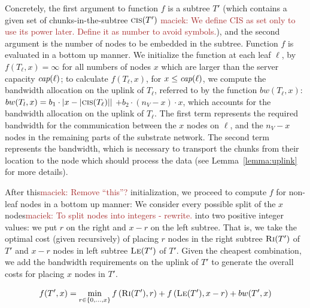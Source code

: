 \documentclass[9pt]{sigcomm-alternate}
\newcommand{\carlo}[1]{\textcolor{red}{carlo: #1}}
\newcommand{\maciek}[1]{\textcolor{brown}{maciek: #1}}
\newcommand{\ChunkCount}{\ensuremath{\textsc{cis}}}
\newcommand{\capacity}{\emph{cap}}
\newcommand{\Tree}{\ensuremath{T}}
\newcommand{\CostTrans}{\ensuremath{b_1}}
\newcommand{\CostCom}{\ensuremath{b_2}}
\newcommand{\Vms}{\ensuremath{n_V}}
\begin{document}
Concretely, the first argument to function $f$
is a subtree $\Tree'$ (which contains a given set of chunks-in-the-subtree $\ChunkCount(\Tree')$ \maciek{We define CIS as set only to use its power later. Define it as number to avoid symbols.}),
and the
second argument is the number of nodes to be embedded in the subtree.
Function $f$ is evaluated in a bottom up manner. We initialize the
function at each leaf $\ell$, by $f(T_{\ell},x) =
\infty$ for all numbers of nodes $x$ which are larger than
the server capacity $\capacity(\ell)$;
to calculate $f(T_{\ell}, x)$, for $x \leq \capacity(\ell)$, we compute the
bandwidth allocation on the uplink of $T_{\ell}$, referred to by the function
$bw(T_{\ell},x)$: $bw(T_l,x)=  \CostTrans \cdot |x - |\ChunkCount(T_{\ell})||$ $
+ \CostCom \cdot (\Vms - x) \cdot x$,
which accounts for the bandwidth allocation on the uplink of $T_{\ell}$. The first
term represents the required bandwidth for the communication between the $x$
nodes on $\ell$, and the $\Vms - x$ nodes in the remaining parts of the substrate
network.
The second term represents
the bandwidth, which is necessary to transport the chunks from their location to
the node which should process the data (see Lemma~\ref{lemma:uplink} for more
details).

After this\maciek{Remove ``this''?} initialization, we proceed to compute $f$ for non-leaf
nodes in a bottom up manner: We consider every possible split of the $x$ nodes\maciek{To split nodes into integers - rewrite.}
into two positive integer
values: we put $r$ on the right and $x - r$ on the left subtree.
That is, we take the optimal cost
(given recursively) of placing $r$ nodes in
the right subtree $\textsc{Ri}(T')$ of $T'$ and $x-r$ nodes in left subtree $\textsc{Le}(T')$ of
$T'$. Given the cheapest combination, we add the bandwidth requirements
on the uplink of $T'$ to generate the overall costs for placing $x$ nodes in $T'$.

$$f(T',x) =   \min_{r \in \{0, \ldots, x\}}  f\left(\textsc{Ri}(T'), r\right) +
f\left(\textsc{Le}(T'), x - r\right) + bw(T',x)$$
\end{document}

